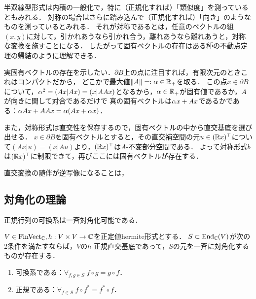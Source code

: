 \documentclass[uplatex,dvipdfmx]{jsreport}
\begin{document}
\begin{remarks}
    半双線型形式は内積の一般化で，特に（正規化すれば）「類似度」を測っているともみれる．
    対称の場合はさらに踏み込んで（正規化すれば）「向き」のようなものを測っているとみれる．
    それが対称であるとは，任意のベクトルの組$(x,y)$に対して，引かれあうなら引かれ合う，離れあうなら離れあうと，対称な変換を施すことになる．
    したがって固有ベクトルの存在はある種の不動点定理の帰結のように理解できる．

    実固有ベクトルの存在を示したい．$\partial B$上の点に注目すれば，有限次元のときこれはコンパクトだから，
    どこかで最大値$\|A\|=:\alpha\in\mathbb{R}_+$を取る．
    この点$x\in\partial B$について，$\alpha^2=(Ax|Ax)=(x|AAx)$となるから，$\alpha\in\mathbb{R}_+$が固有値であるか，$A$が向きに関して対合であるだけで
    真の固有ベクトルは$\alpha x+Ax$であるかである：$\alpha Ax+AAx=\alpha(Ax+\alpha x)$．

    また，対称形式は直交性を保存するので，固有ベクトルの中から直交基底を選び出せる．
    $x\in\partial B$を固有ベクトルとすると，その直交補空間の元$u\in (\mathbb{R} x)^\top$について$(Ax|u)=(x|Au)$より，$(\mathbb{R} x)^\top$は$A$-不変部分空間である．
    よって対称形式$b$は$(\mathbb{R} x)^\top$に制限できて，再びここには固有ベクトルが存在する．

    直交変換の随伴が逆写像になることは，
\end{remarks}

\subsection{対角化の理論}

\begin{tcolorbox}[colframe=ForestGreen, colback=ForestGreen!10!white,breakable,colbacktitle=ForestGreen!40!white,coltitle=black,fonttitle=\bfseries\sffamily,
title=]
    正規行列の可換系は一斉対角化可能である．
\end{tcolorbox}

\begin{proposition}[正規行列の可換系は一斉対角化可能]
    $V\in\mathrm{FinVect}_{\mathbb{C}},h:V\times V\to\mathbb{C}$を正定値hermite形式とする．
    $S\subset\mathrm{End}_{\mathbb{C}}(V)$が次の2条件を満たすならば，$V$の$h$-正規直交基底であって，$S$の元を一斉に対角化するものが存在する．
    \begin{enumerate}
        \item 可換系である：$\forall_{f,g\in S}\;f\circ g=g\circ f$．
        \item 正規である：$\forall_{f\in S}\;f\circ f^*=f^*\circ f$．
    \end{enumerate}
\end{proposition}
\end{document}
